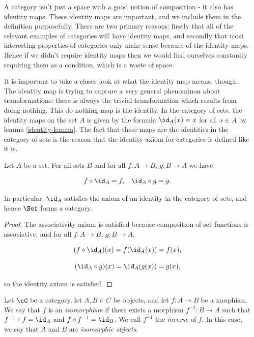 \begin{rem} A category isn't just a space with a good notion of composition - it also has identity maps. These identity maps are important, and we include them in the definition purposefully. There are two primary reasons: firstly that all of the relevant examples of categories will have identity maps, and secondly that most interesting properties of categories only make sense because of the identity maps. Hence if we didn't require identity maps then we would find ourselves constantly requiring them as a condition, which is a waste of space.

It is important to take a closer look at what the identity map means, though. The identity map is trying to capture a very general phenominon about transformations: there is always the trivial transformation which results from doing nothing. This do-nothing map is the identity. In the category of sets, the identity maps on the set $A$ is given by the formula $\id_A(x)=x$ for all $x\in A$ by lemma \ref{identity-lemma}. The fact that these maps are the identities in the category of sets is the reason that the identity axiom for categories is defined like it is.
\end{rem}

\begin{lem}\label{identity-lemma} Let $A$ be a set. For all sets $B$ and for all $f:A\to B$, $g:B\to A$ we have

\begin{align*}
f\circ \id_{A}=f, && \id_{A}\circ g = g.
\end{align*}

In particular, $\id_A$ satisfies the axiom of an identity in the category of sets, and hence $\Set$ forms a category.
\end{lem}
\begin{proof} The associativity axiom is satisfied because composition of set functions is associative, and for all $f:A\to B$, $g:B\to A$,

$$(f\circ \id_{A})(x)=f(\id_{A}(x))=f(x),$$

$$(\id_{A}\circ g)(x)=\id_{A}(g(x))=g(x),$$

so the identity axiom is satisfied.
\end{proof}

\begin{defn}[Isomorphism] Let $\cC$ be a category, let $A,B\in C$ be objects, and let $f:A\to B$ be a morphism. We say that $f$ is an {\em isomorphism} if there exists a morphism $f^{-1}:B\to A$ such that $f^{-1}\circ f= \id_A$ and $f\circ f^{-1}=\id_B$. We call $f^{-1}$ the {\em inverse} of $f$. In this case, we say that $A$ and $B$ are {\em isomorphic objects}.
\end{defn}

